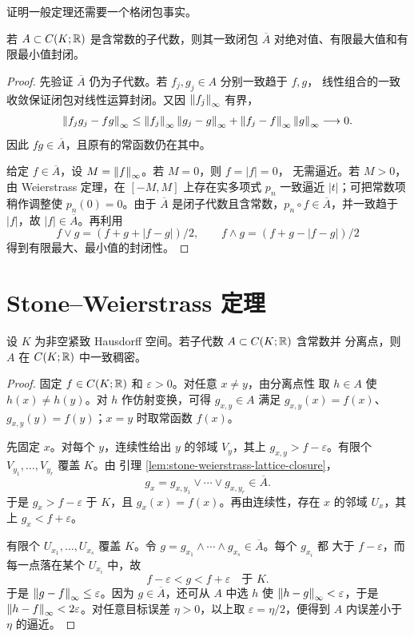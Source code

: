 证明一般定理还需要一个格闭包事实。

\begin{lemma}[代数闭包的格性质]
\label{lem:stone-weierstrass-lattice-closure}
若 $A\subset C(K;\mathbb{R})$ 是含常数的子代数，则其一致闭包
$\overline A$ 对绝对值、有限最大值和有限最小值封闭。
\end{lemma}

\begin{proof}
先验证 $\overline A$ 仍为子代数。若 $f_j,g_j\in A$ 分别一致趋于 $f,g$，
线性组合的一致收敛保证闭包对线性运算封闭。又因 $\left\lVert f_j\right\rVert_\infty$
有界，
\[
 \left\lVert f_jg_j-fg\right\rVert_\infty
 \le\left\lVert f_j\right\rVert_\infty\left\lVert g_j-g\right\rVert_\infty
    +\left\lVert f_j-f\right\rVert_\infty\left\lVert g\right\rVert_\infty\longrightarrow0.
\]
因此 $fg\in\overline A$，且原有的常函数仍在其中。

给定 $f\in\overline A$，设 $M=\left\lVert f\right\rVert_\infty$。若 $M=0$，则 $f=|f|=0$，
无需逼近。若 $M>0$，由 Weierstrass 定理，在
$[-M,M]$ 上存在实多项式 $p_n$ 一致逼近 $|t|$；可把常数项稍作调整使
$p_n(0)=0$。由于 $\overline A$ 是闭子代数且含常数，$p_n\circ f\in
\overline A$，并一致趋于 $|f|$，故 $|f|\in\overline A$。再利用
\[
 f\vee g=(f+g+|f-g|)/2,
 \qquad f\wedge g=(f+g-|f-g|)/2
\]
得到有限最大、最小值的封闭性。
\end{proof}

\section{Stone--Weierstrass 定理}

\begin{theorem}
\label{thm:real-stone-weierstrass}
设 $K$ 为非空紧致 Hausdorff 空间。若子代数 $A\subset C(K;\mathbb{R})$ 含常数并
分离点，则 $A$ 在 $C(K;\mathbb{R})$ 中一致稠密。
\end{theorem}

\begin{proof}
固定 $f\in C(K;\mathbb{R})$ 和 $\varepsilon>0$。对任意 $x\ne y$，由分离点性
取 $h\in A$ 使 $h(x)\ne h(y)$。对 $h$ 作仿射变换，可得
$g_{x,y}\in A$ 满足
$g_{x,y}(x)=f(x)$、$g_{x,y}(y)=f(y)$；$x=y$ 时取常函数 $f(x)$。

先固定 $x$。对每个 $y$，连续性给出 $y$ 的邻域 $V_y$，其上
$g_{x,y}>f-\varepsilon$。有限个 $V_{y_1},\ldots,V_{y_r}$ 覆盖 $K$。由
引理 \ref{lem:stone-weierstrass-lattice-closure}，
\[
 g_x=g_{x,y_1}\vee\cdots\vee g_{x,y_r}\in\overline A.
\]
于是 $g_x>f-\varepsilon$ 于 $K$，且 $g_x(x)=f(x)$。再由连续性，存在
$x$ 的邻域 $U_x$，其上 $g_x<f+\varepsilon$。

有限个 $U_{x_1},\ldots,U_{x_s}$ 覆盖 $K$。令
$g=g_{x_1}\wedge\cdots\wedge g_{x_s}\in\overline A$。每个 $g_{x_i}$ 都
大于 $f-\varepsilon$，而每一点落在某个 $U_{x_i}$ 中，故
\[
 f-\varepsilon<g<f+\varepsilon\quad\text{于 }K.
\]
于是 $\left\lVert g-f\right\rVert_\infty\le\varepsilon$。因为 $g\in\overline A$，还可从
$A$ 中选 $h$ 使 $\left\lVert h-g\right\rVert_\infty<\varepsilon$，于是
$\left\lVert h-f\right\rVert_\infty<2\varepsilon$。对任意目标误差 $\eta>0$，以上取
$\varepsilon=\eta/2$，便得到 $A$ 内误差小于 $\eta$ 的逼近。
\end{proof}

